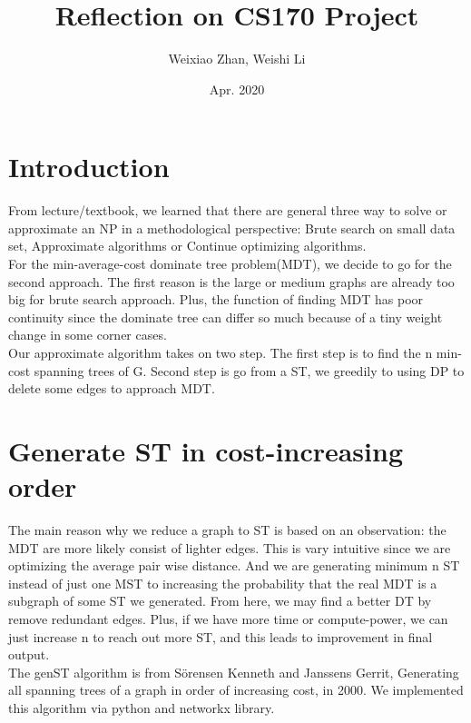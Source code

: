 \documentclass[12pt, a4paper]{article}
\title{Reflection on CS170 Project}
\author{Weixiao Zhan, Weishi Li}
\date{Apr. 2020}
\begin{document}
\maketitle
\clearpage

\section*{Introduction}
From lecture/textbook, we learned that there are general three way to solve or approximate an NP in a methodological perspective:
Brute search on small data set, Approximate algorithms or Continue optimizing algorithms.\\
For the min-average-cost dominate tree problem(MDT), we decide to go for the second approach. The first reason is the large or medium graphs are already too big for brute search approach.
Plus, the function of finding MDT has poor continuity since the dominate tree can differ so much because of a tiny weight change in some corner cases.\\
Our approximate algorithm takes on two step. The first step is to find the n min-cost spanning trees of G. Second step is go from a ST, we greedily to using DP to delete some edges to approach MDT.

\section*{Generate ST in cost-increasing order}
The main reason why we reduce a graph to ST is based on an observation: the MDT are more likely consist of lighter edges. This is vary intuitive since we are optimizing the average pair wise distance.
And we are generating minimum n ST instead of just one MST to increasing the probability that the real MDT is a subgraph of some ST we generated.
From here, we may find a better DT by remove redundant edges.
Plus, if we have more time or compute-power, we can just increase n to reach out more ST, and this leads to improvement in final output.\\
The genST algorithm is from Sörensen Kenneth and Janssens Gerrit, Generating all spanning trees of a graph in order of increasing cost, in 2000.
We implemented this algorithm via python and networkx library.
\end{document}
